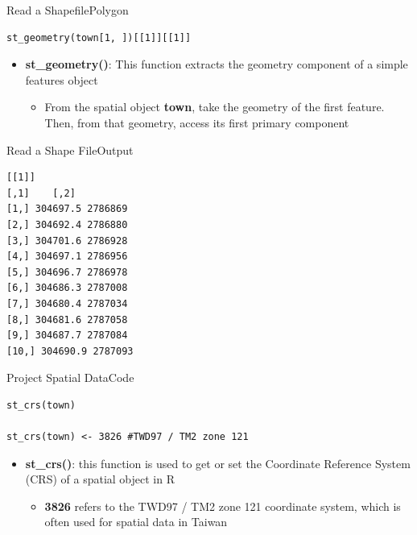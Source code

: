 \documentclass[dvipsnames,hyperref={pdfpagelabels=false}]{beamer}
\begin{document}
\begin{frame}[fragile]{Read a Shapefile}{Polygon}

\begin{lstlisting}
st_geometry(town[1, ])[[1]][[1]]
\end{lstlisting}
\begin{itemize}

\item \textbf{st\_geometry()}: This function extracts the geometry component of a simple features object
	\vspace{0.2cm}
\begin{itemize}
\item From the spatial object \textbf{town}, take the geometry of the first feature. Then, from that geometry, access its first primary component
\end{itemize}

\end{itemize}
\end{frame}


\begin{frame}[fragile]{Read a Shape File}{Output}


\begin{lstlisting}
[[1]]
[,1]    [,2]
[1,] 304697.5 2786869
[2,] 304692.4 2786880
[3,] 304701.6 2786928
[4,] 304697.1 2786956
[5,] 304696.7 2786978
[6,] 304686.3 2787008
[7,] 304680.4 2787034
[8,] 304681.6 2787058
[9,] 304687.7 2787084
[10,] 304690.9 2787093
\end{lstlisting}

\end{frame}


\begin{frame}[fragile]{Project Spatial Data}{Code}
	
\begin{lstlisting}
st_crs(town)

st_crs(town) <- 3826 #TWD97 / TM2 zone 121
\end{lstlisting}
	\begin{itemize}
		\item \textbf{st\_crs()}: this function is used to get or set the Coordinate Reference System (CRS) of a spatial object in R
		\vspace{0.2cm}
		\begin{itemize}
			\item \textbf{3826} refers to the TWD97 / TM2 zone 121 coordinate system, which is often used for spatial data in Taiwan
			
		\end{itemize}
	\end{itemize}
	
	
	
	
\end{frame}
\end{document}
